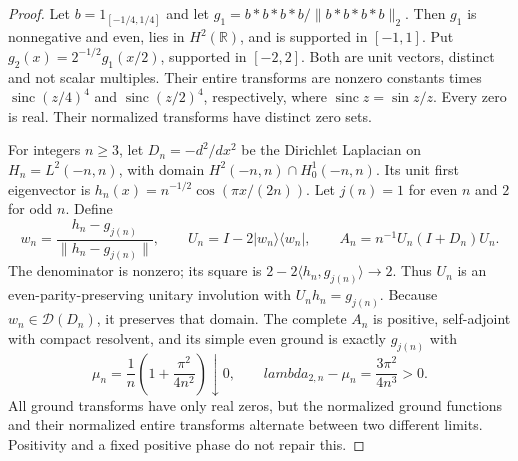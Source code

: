 \documentclass[11pt]{article}
\def\lambda{lambda}%
\theoremstyle{remark}
\begin{document}
\begin{proof}
Let $b=1_{[-1/4,1/4]}$ and let $g_1=b*b*b*b/\|b*b*b*b\|_2$.
Then $g_1$ is nonnegative and even, lies in $H^2(\mathbb R)$, and is
supported in $[-1,1]$. Put $g_2(x)=2^{-1/2}g_1(x/2)$, supported in
$[-2,2]$. Both are unit vectors, distinct and not scalar multiples.
Their entire transforms are nonzero constants times
$\operatorname{sinc}(z/4)^4$ and $\operatorname{sinc}(z/2)^4$,
respectively, where $\operatorname{sinc}z=\sin z/z$. Every zero is real.
Their normalized transforms have distinct zero sets.

For integers $n\ge3$, let $D_n=-d^2/dx^2$ be the Dirichlet Laplacian
on $H_n=L^2(-n,n)$, with domain $H^2(-n,n)\cap H_0^1(-n,n)$.
Its unit first eigenvector is
$h_n(x)=n^{-1/2}\cos(\pi x/(2n))$.
Let $j(n)=1$ for even $n$ and $2$ for odd $n$. Define
\[
 w_n=\frac{h_n-g_{j(n)}}{\|h_n-g_{j(n)}\|},\qquad
 U_n=I-2|w_n\rangle\langle w_n|,\qquad
 A_n=n^{-1}U_n(I+D_n)U_n.
\]
The denominator is nonzero; its square is
$2-2\langle h_n,g_{j(n)}\rangle\to2$.
Thus $U_n$ is an even-parity-preserving unitary involution with
$U_nh_n=g_{j(n)}$. Because $w_n\in\mathcal D(D_n)$, it preserves
that domain. The complete $A_n$ is positive, self-adjoint with compact
resolvent, and its simple even ground is exactly $g_{j(n)}$ with
\[
 \mu_n=\frac1n\left(1+\frac{\pi^2}{4n^2}\right)\downarrow0,
 \qquad \lambda_{2,n}-\mu_n=\frac{3\pi^2}{4n^3}>0.
\]
All ground transforms have only real zeros, but the normalized ground
functions and their normalized entire transforms alternate between two
different limits. Positivity and a fixed positive phase do not repair this.


\end{proof}
\end{document}
